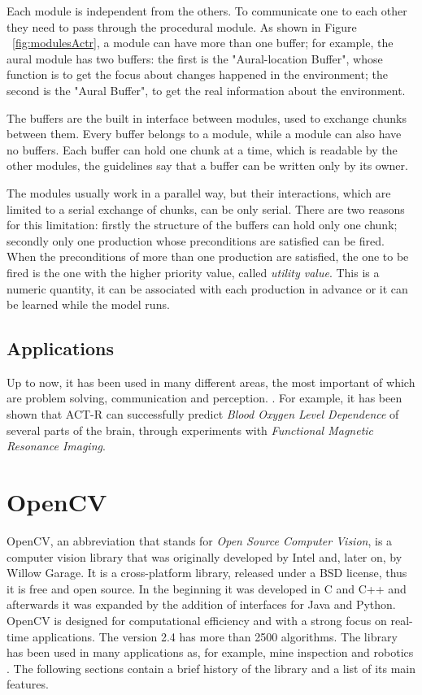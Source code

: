 	Each module is independent from the others. To communicate one to each other they need to pass through the procedural module. As shown in Figure  ~\ref{fig:modulesActr}, a module can have more than one buffer; for example, the aural module has two buffers: the first is the "Aural-location Buffer", whose function is to get the focus about changes happened in the environment; the second is the "Aural Buffer", to get the real information about the environment.

	The buffers are the built in interface between modules, used to exchange chunks between them. Every buffer belongs to a module, while a module can also have no buffers. Each buffer can hold one chunk at a time, which is readable by the other modules, the guidelines say that a buffer can be written only by its owner. 

	The modules usually work in a parallel way, but their interactions, which are limited to a serial exchange of chunks, can be only serial. There are two reasons for this limitation: firstly the structure of the buffers can hold only one chunk; secondly only one production whose preconditions are satisfied can be fired. When the preconditions of more than one production are satisfied, the one to be fired is the one with the higher priority value,  called \emph{utility value}. This is a numeric quantity, it can be associated with each production in advance or it can be learned while the model runs. 
	
	\subsection*{Applications}
	Up to now, it has been used in many different areas, the most important of which are problem solving, communication and perception. .
	For example, it has been shown that \mbox{ACT-R} can successfully predict \emph{Blood Oxygen Level Dependence} of several parts of the brain, through experiments with \emph{Functional Magnetic Resonance Imaging}. 
	
	
  \section{OpenCV}
	\mbox{OpenCV}, an abbreviation that stands for \emph{Open Source Computer Vision}, is a computer vision library that was originally developed by Intel and, later on, by Willow Garage.
	It is a cross-platform library, released under a BSD license, thus it is free and open source. In the beginning it was developed in C and C++ and afterwards it was expanded by the addition of interfaces for Java and Python. \mbox{OpenCV} is designed for computational efficiency and with a strong focus on real-time applications. The version 2.4 has more than 2500 algorithms. The library has been used in many applications as, for example, mine inspection and robotics \cite{OpenCV:MainWebPage}. The following sections contain a brief history of the library and a list of its main features.
		
